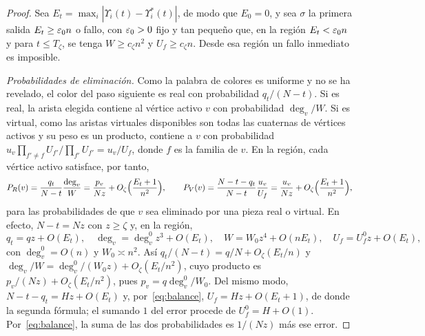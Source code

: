 \begin{proof}
Sea $E_t=\max_i|\Upsilon_i(t)-\Upsilon_i^*(t)|$, de modo que $E_0=0$, y sea $\sigma$ la primera
salida $E_t\ge\varepsilon_0n$ o fallo, con
$\varepsilon_0>0$ fijo y tan pequeño que, en la región $E_t<\varepsilon_0 n$ y para $t\le T_\zeta$, se tenga
$W\ge c_\zeta n^2$ y $U_f\ge c_\zeta n$. Desde esa región un fallo inmediato es imposible.

\emph{Probabilidades de eliminación.} Como la palabra de colores es uniforme y no se ha revelado,
el color del paso siguiente es real con probabilidad $q_t/(N-t)$. Si es real, la arista elegida
contiene al vértice activo $v$ con probabilidad $\deg_v/W$. Si es virtual, como las aristas
virtuales disponibles son todas las cuaternas de vértices activos y su peso es un producto, contiene a $v$
con probabilidad $u_v\prod_{f'\ne f}U_{f'}\big/\prod_{f'}U_{f'}=u_v/U_f$, donde $f$ es la
familia de $v$. En la región, cada vértice activo satisface, por tanto,
\begin{equation}\label{eq:tasas}
 P_R(v)=\frac{q_t}{N-t}\frac{\deg_v}{W}=\frac{p_v}{Nz}+O_\zeta\Bigl(\frac{E_t+1}{n^2}\Bigr),\qquad
 P_V(v)=\frac{N-t-q_t}{N-t}\frac{u_v}{U_f}=\frac{u_v}{Nz}+O_\zeta\Bigl(\frac{E_t+1}{n^2}\Bigr),
\end{equation}
para las probabilidades de que $v$ sea eliminado por una pieza real o virtual. En efecto,
$N-t=Nz$ con $z\ge\zeta$ y, en la región,
\[
 q_t=qz+O(E_t),\quad \deg_v=\deg_v^0z^3+O(E_t),\quad W=W_0z^4+O(nE_t),\quad U_f=U_f^0z+O(E_t),
\]
con $\deg_v^0=O(n)$ y $W_0\asymp n^2$. Así $q_t/(N-t)=q/N+O_\zeta(E_t/n)$ y
$\deg_v/W=\deg_v^0/(W_0z)+O_\zeta(E_t/n^2)$, cuyo producto es $p_v/(Nz)+O_\zeta(E_t/n^2)$, pues
$p_v=q\deg_v^0/W_0$. Del mismo modo, $N-t-q_t=Hz+O(E_t)$ y, por~\eqref{eq:balance},
$U_f=Hz+O(E_t+1)$, de donde la segunda fórmula; el sumando $1$ del error procede de
$U_f^0=H+O(1)$. Por~\eqref{eq:balance}, la suma de las dos probabilidades es $1/(Nz)$ más ese
error.


\end{proof}
